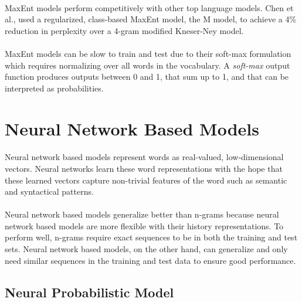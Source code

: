 \paragraph{}
MaxEnt models perform competitively with other top language models. Chen et al., used a regularized, class-based MaxEnt model, the M model, to achieve a 4\% reduction in perplexity over a 4-gram modified Kneser-Ney model.
\paragraph{}

MaxEnt models can be slow to train and test due to their soft-max formulation which requires normalizing over all words in the vocabulary. A \emph{soft-max} output function produces outputs between 0 and 1, that sum up to 1, and that can be interpreted as probabilities. 

\section{Neural Network Based Models} \label{sec:nplm}
\paragraph{}
Neural network based models represent words as real-valued, low-dimensional vectors. Neural networks learn these word representations with the hope that these learned vectors capture non-trivial features of the word such as semantic and syntactical patterns.
\paragraph{}
Neural network based models generalize better than n-grams because neural network based models are more flexible with their history representations. To perform well, n-grams require exact sequences to be in both the training and test sets. Neural network based models, on the other hand, can generalize and only need similar sequences in the training and test data to ensure good performance.

\subsection{Neural Probabilistic Model}
